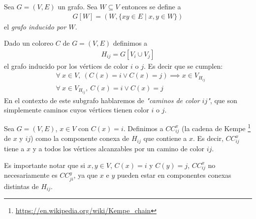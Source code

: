 \begin{comment}
\begin{proposition}\label{graph_cyclic_color}
Un grafo cíclico $C_n$ con $n \ge 2$ es bipartito si $n$ es par y es $3$-coloreable si $n$ es impar. Es decir,
\begin{align}
    \chi(C_n) = 
    \begin{cases}
                2 & |\ \text{n es par} \\
                3 & |\ \text{n es impar}
    \end{cases}
\end{align}
\end{proposition}

\begin{proof}
Visto en clase.
\end{proof}
\end{comment}

\begin{definition}
Sea $G = (V, E)$ un grafo. Sea $W \subseteq V$ entonces se define a \begin{align}
    G[W] = \left(W, \{xy \in E \mid x,y \in W\}\right)
\end{align}
el \emph{grafo inducido por $W$}.
\end{definition}

\begin{definition}
Dado un coloreo $C$ de $G = (V,E)$ definimos a
\begin{align}
    H_{ij} = G\left[V_i \cup V_j\right]
\end{align}
el grafo inducido por los vértices de color $i$ o $j$.
Es decir que se cumplen:
\begin{align}
    &\forall~ x \in V,~ (C(x) = i \vee C(x) = j) \implies x \in V_{H_{ij}}\\
    &\forall~ x \in V_{H_{ij}},~ C(x) = i \vee C(x) = j
\end{align}
En el contexto de este subgrafo hablaremos de \emph{"caminos de color $ij$"}, que son simplemente caminos cuyos vértices tienen color $i$ o $j$.
\end{definition}

\begin{definition}
Sea $G = (V, E)$, $x \in V$ con $C(x) = i$. Definimos a $CC^x_{ij}$ (la cadena de Kempe \footnote{\url{https://en.wikipedia.org/wiki/Kempe_chain}} de $x$ y $ij$) como la componente conexa de $H_{ij}$ que contiene a $x$.
Es decir, $CC^x_{ij}$ tiene a $x$ y a todos los vértices alcanzables por un camino de color $ij$.

Es importante notar que si $x,y \in V$, $C(x) = i$ y $C(y) = j$, $CC^x_{ij}$ no necesariamente es $CC^y_{ji}$, ya que $x$ e $y$ pueden estar en componentes conexas distintas de $H_{ij}$.
\end{definition}

